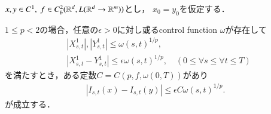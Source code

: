 	\begin{screen}
		\begin{lem}
		\label{lem:key_lemma_for_continuity_theorem}
			\begin{description}
				$x,y \in C^1,\ f \in C^2_b(\mathbb{R}^d,L(\mathbb{R}^d \rightarrow \mathbb{R}^m))$とし，
				$x_0 = y_0$を仮定する．
				\item[(1)]
					$1 \leq p < 2$の場合，任意の$\epsilon > 0$に対し或るcontrol function $\omega$が存在して
					\begin{align}
						&\left| X^1_{s,t} \right|, \left| Y^1_{s,t} \right|
						\leq \omega(s,t)^{1/p}, \\
						&\left| X^1_{s,t} - Y^1_{s,t} \right| \leq \epsilon \omega(s,t)^{1/p},
						\quad (0 \leq \forall s \leq \forall t \leq T)
					\end{align}
					を満たすとき，ある定数$C=C(p,f,\omega(0,T))$があり
					\begin{align}
						\left|I_{s,t}(x) - I_{s,t}(y) \right|
						\leq \epsilon C \omega(s,t)^{1/p}.
					\end{align}
					が成立する．
				
				\item[(2)]
			\end{description}
		\end{lem}
	\end{screen}
